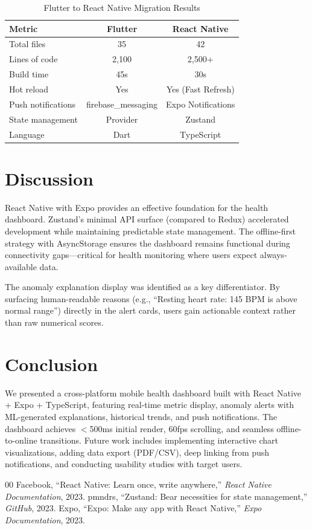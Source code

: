 \documentclass[conference]{IEEEtran}
\begin{document}
\begin{table}[H]
\centering
\caption{Flutter to React Native Migration Results}
\label{tab:migration}
\begin{tabular}{lcc}
\toprule
\textbf{Metric} & \textbf{Flutter} & \textbf{React Native} \\
\midrule
Total files & 35 & 42 \\
Lines of code & 2,100 & 2,500+ \\
Build time & 45s & 30s \\
Hot reload & Yes & Yes (Fast Refresh) \\
Push notifications & firebase\_messaging & Expo Notifications \\
State management & Provider & Zustand \\
Language & Dart & TypeScript \\
\bottomrule
\end{tabular}
\end{table}

\section{Discussion}
React Native with Expo provides an effective foundation for the health dashboard. Zustand's minimal API surface (compared to Redux) accelerated development while maintaining predictable state management. The offline-first strategy with AsyncStorage ensures the dashboard remains functional during connectivity gaps---critical for health monitoring where users expect always-available data.

The anomaly explanation display was identified as a key differentiator. By surfacing human-readable reasons (e.g., ``Resting heart rate: 145 BPM is above normal range'') directly in the alert cards, users gain actionable context rather than raw numerical scores.

\section{Conclusion}
We presented a cross-platform mobile health dashboard built with React Native + Expo + TypeScript, featuring real-time metric display, anomaly alerts with ML-generated explanations, historical trends, and push notifications. The dashboard achieves $<$500ms initial render, 60fps scrolling, and seamless offline-to-online transitions. Future work includes implementing interactive chart visualizations, adding data export (PDF/CSV), deep linking from push notifications, and conducting usability studies with target users.

\begin{thebibliography}{00}
 Facebook, ``React Native: Learn once, write anywhere,'' \textit{React Native Documentation}, 2023.
 pmndrs, ``Zustand: Bear necessities for state management,'' \textit{GitHub}, 2023.
 Expo, ``Expo: Make any app with React Native,'' \textit{Expo Documentation}, 2023.
\end{thebibliography}
\end{document}
